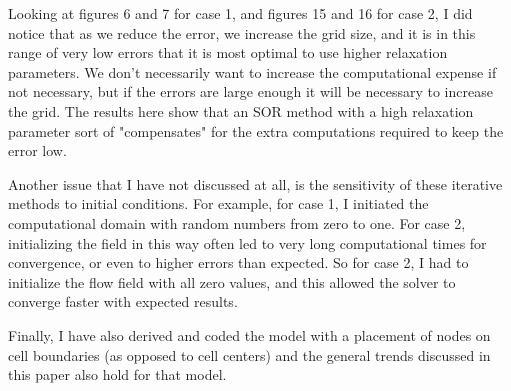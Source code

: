 \documentclass{article}
\begin{document}
\vspace{1em}

\noindent Looking at figures  6 and  7 for case 1, and figures  15 and 16 for case 2, I did notice that as we reduce the error, we increase the grid size, and it is in this range of very low errors that it is most optimal to use higher relaxation parameters. We don't necessarily want to increase the computational expense if not necessary, but if the errors are large enough it will be necessary to increase the grid. The results here show that an SOR method with a high relaxation parameter sort of "compensates" for the extra computations required to keep the error low.

\vspace{1em}

\noindent Another issue that I have not discussed at all, is the sensitivity of these iterative methods to initial conditions. For example, for case 1, I initiated the computational domain with random numbers from zero to one. For case 2, initializing the field in this way often led to very long computational times for convergence, or even to higher errors than expected. So for case 2, I had to initialize the flow field with all zero values, and this allowed the solver to converge faster with expected results.

\vspace{1em}

\noindent Finally, I have also derived and coded the model with a placement of nodes on cell boundaries (as opposed to cell centers) and the general trends discussed in this paper also hold for that model.
\end{document}

